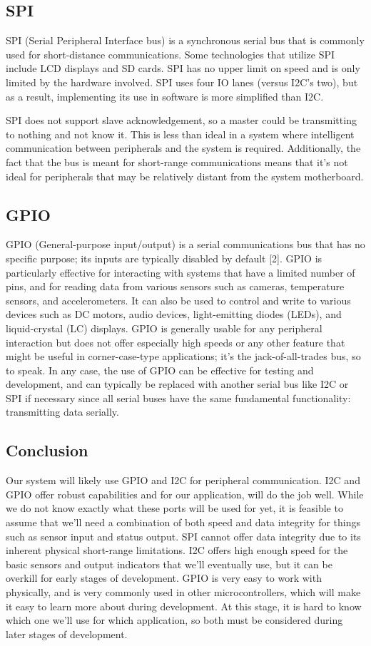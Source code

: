 \documentclass[letterpaper,10pt,serif,draftclsnofoot,onecolumn,compsoc,titlepage]{IEEEtran}
\begin{document}
\subsection{SPI}
SPI (Serial Peripheral Interface bus) is a synchronous serial bus that is commonly used for short-distance communications. Some technologies that utilize SPI include LCD displays and SD cards. SPI has no upper limit on speed and is only limited by the hardware involved. SPI uses four IO lanes (versus I2C’s two), but as a result, implementing its use in software is more simplified than I2C. 

SPI does not support slave acknowledgement, so a master could be transmitting to nothing and not know it. This is less than ideal in a system where intelligent communication between peripherals and the system is required. Additionally, the fact that the bus is meant for short-range communications means that it’s not ideal for peripherals that may be relatively distant from the system motherboard.

\subsection{GPIO}
GPIO (General-purpose input/output) is a serial communications bus that has no specific purpose; its inputs are typically disabled by default [2]. GPIO is particularly effective for interacting with systems that have a limited number of pins, and for reading data from various sensors such as cameras, temperature sensors, and accelerometers. It can also be used to control and write to various devices such as DC motors, audio devices, light-emitting diodes (LEDs), and liquid-crystal (LC) displays. GPIO is generally usable for any peripheral interaction but does not offer especially high speeds or any other feature that might be useful in corner-case-type applications; it’s the jack-of-all-trades bus, so to speak. In any case, the use of GPIO can be effective for testing and development, and can typically be replaced with another serial bus like I2C or SPI if necessary since all serial buses have the same fundamental functionality: transmitting data serially.

\subsection{Conclusion}
Our system will likely use GPIO and I2C for peripheral communication. I2C and GPIO offer robust capabilities and for our application, will do the job well. While we do not know exactly what these ports will be used for yet, it is feasible to assume that we’ll need a combination of both speed and data integrity for things such as sensor input and status output. SPI cannot offer data integrity due to its inherent physical short-range limitations. I2C offers high enough speed for the basic sensors and output indicators that we’ll eventually use, but it can be overkill for early stages of development. GPIO is very easy to work with physically, and is very commonly used in other microcontrollers, which will make it easy to learn more about during development. At this stage, it is hard to know which one we’ll use for which application, so both must be considered during later stages of development.
\end{document}
